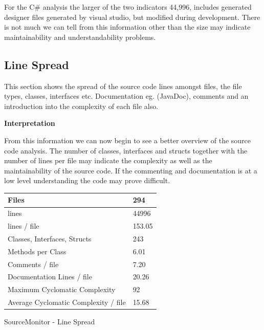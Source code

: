 		\normalsize
		{	
			For the C\# analysis the larger of the two indicators 44,996, includes generated designer files generated by visual studio, but modified during development.
			There is not much we can tell from this information other than the size may indicate maintainability and understandability problems.
			\newline
		}
			



	\subsection{Line Spread}

		\normalsize
		{
			This section shows the spread of the source code lines amongst files, the file types, classes, interfaces etc.  
			Documentation eg. (JavaDoc), comments and an introduction into the complexity of each file also.
			\newline
		}

		\vspace{-7mm}
		\begin{multicols}{2}
		
			\large{\bfseries{Interpretation}}
			\vspace{2mm}
			
			\normalsize
			{
				From this information we can now begin to see a better overview of the source code analysis.  The number of classes, interfaces and structs
				together with the number of lines per file may indicate the complexity as well as the maintainability of the source code. If the commenting and documentation 
				is at a low level understanding the code may prove difficult.  
				\newline
			}			

			\columnbreak
			
		
			\begin{tablehere}
				\centering
				\small
				{
					\begin{tabular}{ | l | l |}
																					   \hline
						Files									& 294 					\\ \hline
						lines 									& 44996					\\ \hline
						lines / file							& 153.05 				\\ \hline
						Classes, Interfaces, Structs			& 243					\\ \hline
						Methods per Class						& 6.01					\\ \hline
						Comments / file							& 7.20 					\\ \hline
						Documentation Lines / file 				& 20.26 				\\ \hline
						Maximum Cyclomatic Complexity 			& 92 					\\ \hline
						Average Cyclomatic Complexity / file	& 15.68					\\ \hline
					\end{tabular}
				}
				\caption{SourceMonitor - Line Spread}
				\label{sec:linspreadresult}	
			\end{tablehere}	
		
		\end{multicols}
				
